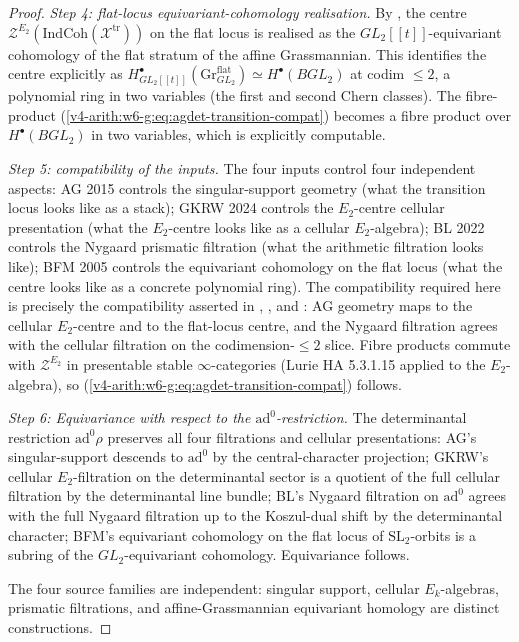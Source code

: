 \begin{proof}
\emph{Step 4: flat-locus equivariant-cohomology realisation.} By
, the centre
\(\mathcal{Z}^{E_{2}}(\mathrm{IndCoh}(\mathcal{X}^{\mathrm{tr}}))\) on
the flat locus is realised as the \(GL_{2}[[t]]\)-equivariant
cohomology of the flat stratum of the affine Grassmannian. This
identifies the centre explicitly as
\(H^{\bullet}_{GL_{2}[[t]]}(\mathrm{Gr}_{GL_{2}}^{\mathrm{flat}})\simeq H^{\bullet}(BGL_{2})\)
at codim \(\leq 2\), a polynomial ring in two variables (the first and
second Chern classes). The fibre-product
(\ref{v4-arith:w6-g:eq:agdet-transition-compat}) becomes a fibre
product over \(H^{\bullet}(BGL_{2})\) in two variables, which is
explicitly computable.

\emph{Step 5: compatibility of the inputs.} The four inputs
control four independent aspects: AG 2015 controls the
singular-support geometry (what the transition locus looks like as a
stack); GKRW 2024 controls the \(E_{2}\)-centre cellular presentation
(what the \(E_{2}\)-centre looks like as a cellular \(E_{2}\)-algebra);
BL 2022 controls the Nygaard prismatic filtration (what the
arithmetic filtration looks like); BFM 2005 controls the
equivariant cohomology on the flat locus (what the centre looks
like as a concrete polynomial ring). The compatibility required here is
precisely the compatibility asserted in
,
, and
: AG geometry maps to the
cellular \(E_{2}\)-centre and to the flat-locus centre, and the
Nygaard filtration agrees with the cellular filtration on the
codimension-\(\leq2\) slice.
Fibre products commute with \(\mathcal{Z}^{E_{2}}\) in
presentable stable \(\infty\)-categories (Lurie HA 5.3.1.15 applied to
the \(E_{2}\)-algebra), so
(\ref{v4-arith:w6-g:eq:agdet-transition-compat}) follows.

\emph{Step 6: Equivariance with respect to the
\(\mathrm{ad}^{0}\)-restriction.} The determinantal restriction
\(\mathrm{ad}^{0}\rho\) preserves all four filtrations and cellular
presentations: AG's singular-support descends to \(\mathrm{ad}^{0}\)
by the central-character projection; GKRW's cellular
\(E_{2}\)-filtration on the determinantal sector is a quotient of
the full cellular filtration by the determinantal line bundle; BL's
Nygaard filtration on \(\mathrm{ad}^{0}\) agrees with the full
Nygaard filtration up to the Koszul-dual shift by the determinantal
character; BFM's equivariant cohomology on the flat locus of
\(\mathrm{SL}_{2}\)-orbits is a subring of the \(GL_{2}\)-equivariant
cohomology. Equivariance follows.

The four source families are independent: singular support,
cellular \(E_{k}\)-algebras, prismatic filtrations, and
affine-Grassmannian equivariant homology are distinct constructions.
\end{proof}

